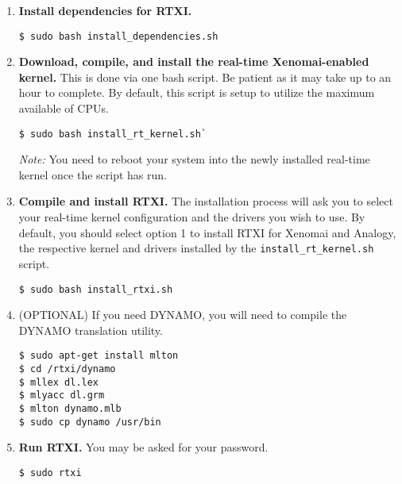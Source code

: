 \begin{enumerate}
\item \textbf{Install dependencies for RTXI.}

\begin{verbatim}
$ sudo bash install_dependencies.sh
\end{verbatim}

\item \textbf{Download, compile, and install the real-time Xenomai-enabled kernel.} This is done via one bash script. Be patient as it may take up to an hour to complete. By default, this script is setup to utilize the maximum available of CPUs.

\begin{verbatim}
$ sudo bash install_rt_kernel.sh`
\end{verbatim}

\begin{comment}
When the configuration options appear, specify your processor. If your processor is not listed, choose the 'generic' option.
\end{comment}
\textit{Note:} You need to reboot your system into the newly installed real-time kernel once the script has run. 

\item \textbf{Compile and install RTXI.} The installation process will ask you to select your real-time kernel configuration and the drivers you wish to use. By default, you should select option 1 to install RTXI for Xenomai and Analogy, the respective kernel and drivers installed by the \texttt{install\_rt\_kernel.sh} script.

\begin{verbatim}
$ sudo bash install_rtxi.sh
\end{verbatim}

\item (OPTIONAL) If you need DYNAMO, you will need to compile the DYNAMO translation utility.
\label{install DYNAMO}
\begin{verbatim}
$ sudo apt-get install mlton
$ cd /rtxi/dynamo
$ mllex dl.lex
$ mlyacc dl.grm
$ mlton dynamo.mlb
$ sudo cp dynamo /usr/bin
\end{verbatim}

\item \textbf{Run RTXI.} You may be asked for your password.

\begin{verbatim}
$ sudo rtxi
\end{verbatim}

\end{enumerate}